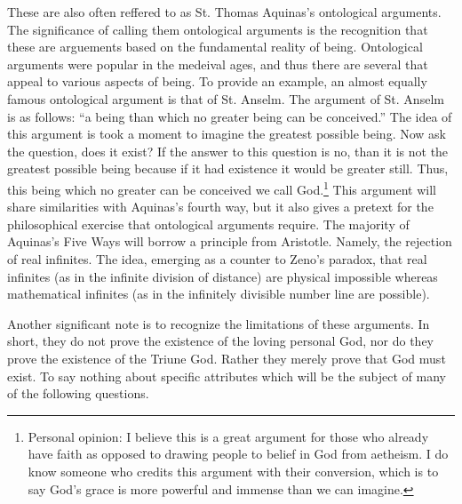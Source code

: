\documentclass{ucetd}
\begin{document}
These are also often reffered to as St. Thomas Aquinas's ontological arguments. The significance of calling them ontological arguments is the recognition that these are arguements based on the fundamental reality of being. Ontological arguments were popular in the medeival ages, and thus there are several that appeal to various aspects of being. To provide an example, an almost equally famous ontological argument is that of St. Anselm. The argument of St. Anselm is as follows: ``a being than which no greater being can be conceived.'' The idea of this argument is took a moment to imagine the greatest possible being. Now ask the question, does it exist? If the answer to this question is no, than it is not the greatest possible being because if it had existence it would be greater still. Thus, this being which no greater can be conceived we call God.\footnote{Personal opinion: I believe this is a great argument for those who already have faith as opposed to drawing people to belief in God from aetheism. I do know someone who credits this argument with their conversion, which is to say God's grace is more powerful and immense than we can imagine.} This argument will share similarities with Aquinas's fourth way, but it also gives a pretext for the philosophical exercise that ontological arguments require. The majority of Aquinas's Five Ways will borrow a principle from Aristotle. Namely, the rejection of real infinites. The idea, emerging as a counter to Zeno's paradox, that real infinites (as in the infinite division of distance) are physical impossible whereas mathematical infinites (as in the infinitely divisible number line are possible).

Another significant note is to recognize the limitations of these arguments. In short, they do not prove the existence of the loving personal God, nor do they prove the existence of the Triune God. Rather they merely prove that God must exist. To say nothing about specific attributes which will be the subject of many of the following questions.
\end{document}
